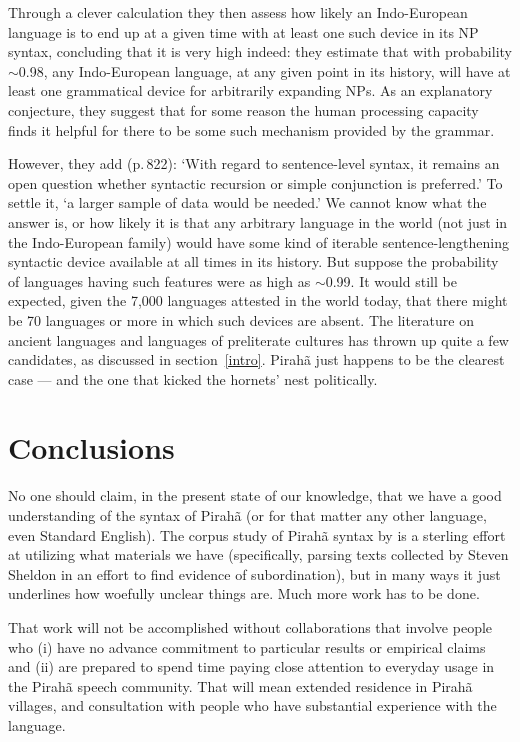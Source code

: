 \documentclass[output=paper,colorlinks,citecolor=brown
]{langscibook}
\begin{document}
Through a clever calculation they then assess how likely an Indo-European
language is to end up at a given time with at least one such device in
its NP syntax, concluding that it is very high indeed: they estimate
that with probability $\sim$0.98, any Indo-European language, at any
given point in its history, will have at least one grammatical device
for arbitrarily expanding NPs. As an explanatory conjecture, they suggest
that for some reason the human processing capacity finds it helpful for
there to be some such mechanism provided by the grammar.

However, they add (p.\,822): `With regard to sentence-level syntax,
it remains an open question whether syntactic recursion or simple
conjunction is preferred.' To settle it, `a larger sample of data
would be needed.' We cannot know what the answer is, or how likely
it is that any arbitrary language in the world (not just in the
Indo-European family) would have some kind of iterable
sentence-lengthening syntactic device available at all times in its
history. But suppose the probability of languages having such features
were as high as $\sim$0.99. It would still be expected, given the
7,000 languages attested in the world today, that there might be 70
languages or more in which such devices are absent. The literature
on ancient languages and languages of preliterate cultures has thrown
up quite a few candidates, as discussed in section~\ref{intro}.
Pirah{\~a} just happens to be the clearest case --- and the one that
kicked the hornets' nest politically.

\section{Conclusions}

No one should claim, in the present state of our knowledge, that we
have a good understanding of the syntax of Pirah{\~a} (or for that
matter any other language, even Standard English). The corpus study
of Pirah{\~a} syntax by \citet{FutrellEtAl16} is a sterling effort
at utilizing what materials we have (specifically, parsing texts
collected by Steven Sheldon in an effort to find evidence of
subordination), but in many ways it just underlines how woefully
unclear things are. Much more work has to be done.

That work will not be accomplished without collaborations that involve
people who (i) have no advance commitment to particular results or
empirical claims and (ii) are prepared to spend time paying close
attention to everyday usage in the Pirah{\~a} speech community. That
will mean extended residence in Pirah{\~a} villages, and consultation
with people who have substantial experience with the language.
\end{document}
